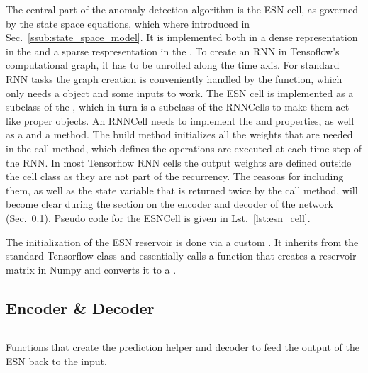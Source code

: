 The central part of the anomaly detection algorithm is the ESN cell, as
governed by the state space equations, which where introduced in
Sec.~\ref{ssub:state_space_model}. It is implemented both in a dense
representation in the  and a sparse respresentation in the
.  To create an RNN in Tensoflow's computational graph, it
has to be unrolled along the time axis. For standard RNN tasks the graph
creation is conveniently handled by the  function,
which only needs a  object and some inputs to
work.  The ESN cell is implemented as a subclass of the
, which in turn is a subclass of the RNNCells
to make them act like proper  objects.  An RNNCell needs to
implement the  and  properties, as well as a
 and a  method.  The build method initializes all the
weights that are needed in the call method, which defines the operations are
executed at each time step of the RNN.  In most Tensorflow RNN cells the output
weights are defined outside the cell class as they are not part of the
recurrency. The reasons for including them, as well as the state variable that
is returned twice by the call method, will become clear during the section on
the encoder and decoder of the network (Sec.~\ref{sec:encoder_decoder}).
Pseudo code for the ESNCell is given in Lst.~\ref{lst:esn_cell}.

The initialization of the ESN reservoir is done via a custom
.  It inherits from the standard Tensorflow
 class and essentially calls a function that creates a
reservoir matrix in Numpy and converts it to a .


\subsection{Encoder \& Decoder}%
\label{sec:encoder_decoder}

\begin{listing}[t]
  \inputminted{py}{pseudocode/build_model.py}
  \caption{Functions that create the prediction helper and decoder to feed the
  output of the ESN back to the input.}
  \label{lst:decoder}
\end{listing}

